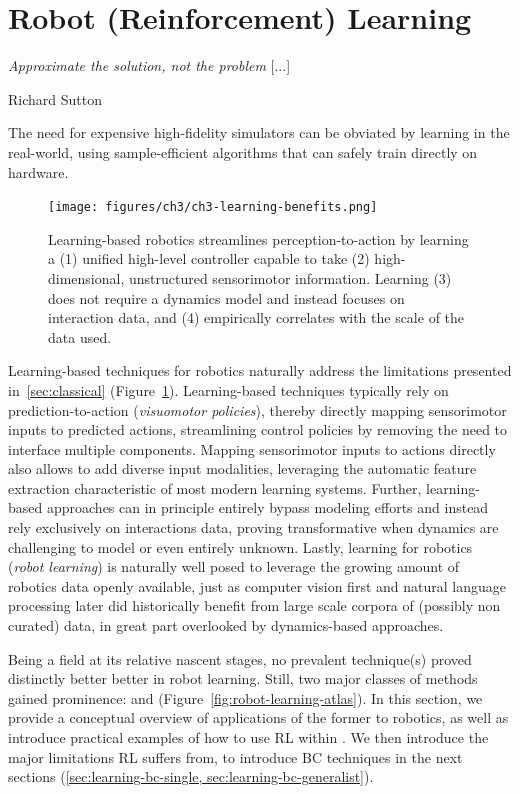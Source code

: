 \section{Robot (Reinforcement) Learning}
\label{sec:learning-rl}

\epigraph{\textit{Approximate the solution, not the problem} [...]}{Richard Sutton}

\begin{tldr}
The need for expensive high-fidelity simulators can be obviated by learning in the real-world, using sample-efficient algorithms that can safely train directly on hardware.
\end{tldr}

\begin{figure}
    \centering
    \texttt{[image: figures/ch3/ch3-learning-benefits.png]}
    \caption{Learning-based robotics streamlines perception-to-action by learning a (1) unified high-level controller capable to take (2) high-dimensional, unstructured sensorimotor information. Learning (3) does not require a dynamics model and instead focuses on interaction data, and (4) empirically correlates with
    the scale of the data used.
    }
    \label{fig:robot-learning-upsides}
\end{figure}

Learning-based techniques for robotics naturally address the limitations presented in~\ref{sec:classical} (Figure~\ref{fig:robot-learning-upsides}).
Learning-based techniques typically rely on prediction-to-action (\emph{visuomotor policies}), thereby directly mapping sensorimotor inputs to predicted actions, streamlining control policies by removing the need to interface multiple components.
Mapping sensorimotor inputs to actions directly also allows to add diverse input modalities, leveraging the automatic feature extraction characteristic of most modern learning systems.
Further, learning-based approaches can in principle entirely bypass modeling efforts and instead rely exclusively on interactions data, proving transformative when dynamics are challenging to model or even entirely unknown.
Lastly, learning for robotics (\emph{robot learning}) is naturally well posed to leverage the growing amount of robotics data openly available, just as computer vision first and natural language processing later did historically benefit from large scale corpora of (possibly non curated) data, in great part overlooked by dynamics-based approaches.

Being a field at its relative nascent stages, no prevalent technique(s) proved distinctly better better in robot learning.
Still, two major classes of methods gained prominence:  and  (Figure~\ref{fig:robot-learning-atlas}).
In this section, we provide a conceptual overview of applications of the former to robotics, as well as introduce practical examples of how to use RL within \lerobot.
We then introduce the major limitations RL suffers from, to introduce BC techniques in the next sections (\ref{sec:learning-bc-single, sec:learning-bc-generalist}).

